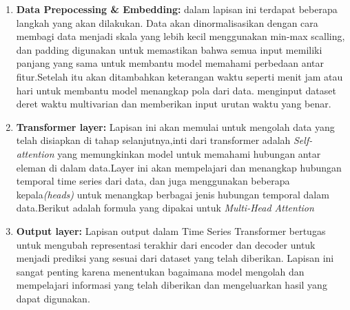 \begin{enumerate}
    \item \textbf{Data Prepocessing \& Embedding:} dalam lapisan ini terdapat beberapa langkah yang akan dilakukan. Data akan dinormalisasikan dengan cara membagi data menjadi skala yang lebih kecil menggunakan min-max scalling, dan padding digunakan untuk memastikan bahwa semua input memiliki panjang yang sama untuk membantu model memahami perbedaan antar fitur.Setelah itu akan ditambahkan keterangan waktu seperti menit jam atau hari untuk membantu model menangkap pola dari data. menginput dataset deret waktu multivarian dan memberikan input urutan waktu yang benar.
    \item \textbf{Transformer layer:} Lapisan ini akan memulai untuk mengolah data yang telah disiapkan di tahap selanjutnya,inti dari transformer adalah \textit{Self-attention} yang memungkinkan model untuk memahami hubungan antar eleman di dalam data.Layer ini akan mempelajari dan  menangkap hubungan temporal time series dari data, dan juga menggunakan beberapa kepala\textit{(heads)} untuk menangkap berbagai jenis hubungan temporal dalam data.Berikut adalah formula yang dipakai untuk \textit{Multi-Head Attention}
   \item \textbf{Output layer:} Lapisan output dalam Time Series Transformer bertugas untuk mengubah representasi terakhir dari encoder dan decoder untuk menjadi prediksi yang sesuai dari dataset yang telah diberikan. Lapisan ini sangat penting karena menentukan bagaimana model mengolah dan mempelajari informasi yang telah diberikan dan mengeluarkan hasil yang dapat digunakan.

\end{enumerate}
